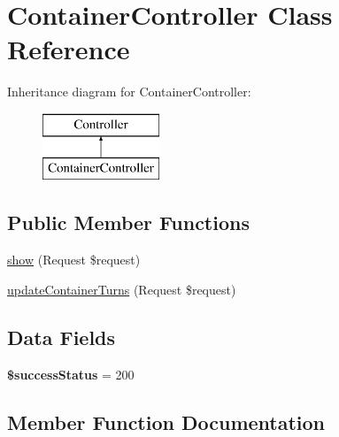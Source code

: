 \hypertarget{class_app_1_1_http_1_1_controllers_1_1_a_p_i_1_1_container_controller}{}\section{Container\+Controller Class Reference}
\label{class_app_1_1_http_1_1_controllers_1_1_a_p_i_1_1_container_controller}
Inheritance diagram for Container\+Controller\+:\begin{figure}[H]
\begin{center}
\leavevmode
\includegraphics[height=2.000000cm]{class_app_1_1_http_1_1_controllers_1_1_a_p_i_1_1_container_controller}
\end{center}
\end{figure}
\subsection*{Public Member Functions}
\begin{DoxyCompactItemize}
\item 
\mbox{\hyperlink{class_app_1_1_http_1_1_controllers_1_1_a_p_i_1_1_container_controller_a5ab3bd1c209b4353ac32bd7ee51985d2}{show}} (Request \$request)
\item 
\mbox{\hyperlink{class_app_1_1_http_1_1_controllers_1_1_a_p_i_1_1_container_controller_a4e7f78121af37bfccc0b0274e280d37e}{update\+Container\+Turns}} (Request \$request)
\end{DoxyCompactItemize}
\subsection*{Data Fields}
\begin{DoxyCompactItemize}
\item 
\mbox{\label{class_app_1_1_http_1_1_controllers_1_1_a_p_i_1_1_container_controller_a4fde01aada3b602338d7002a598a8763}} 
{\bfseries \$success\+Status} = 200
\end{DoxyCompactItemize}


\subsection{Member Function Documentation}
\mbox{\label{class_app_1_1_http_1_1_controllers_1_1_a_p_i_1_1_container_controller_a5ab3bd1c209b4353ac32bd7ee51985d2}} 

